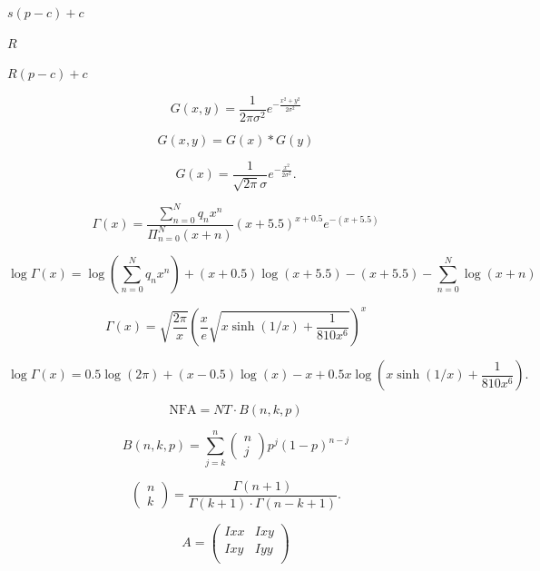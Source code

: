 \documentclass{article}
\begin{document}
$s (p - c) + c$
\pagebreak

$R$
\pagebreak

$R (p - c) + c$
\pagebreak

\[ G(x,y) = \frac{1}{2\pi\sigma^2} e^{-\frac{x^2+y^2}{2\sigma^2}} \]
\pagebreak

\[ G(x,y) = G(x) * G(y) \]
\pagebreak

\[ G(x) = \frac{1}{\sqrt{2\pi}\sigma} e^{-\frac{x^2}{2\sigma^2}}. \]
\pagebreak

\[ \Gamma(x) = \frac{ \sum_{n=0}^{N} q_n x^n }{ \Pi_{n=0}^{N} (x+n) } (x+5.5)^{x+0.5} e^{-(x+5.5)} \]
\pagebreak

\[ \log\Gamma(x) = \log\left( \sum_{n=0}^{N} q_n x^n \right) + (x+0.5) \log(x+5.5) - (x+5.5) - \sum_{n=0}^{N} \log(x+n) \]
\pagebreak

\[ \Gamma(x) = \sqrt{\frac{2\pi}{x}} \left( \frac{x}{e} \sqrt{ x\sinh(1/x) + \frac{1}{810x^6} } \right)^x \]
\pagebreak

\[ \log\Gamma(x) = 0.5\log(2\pi) + (x-0.5)\log(x) - x + 0.5x\log\left( x\sinh(1/x) + \frac{1}{810x^6} \right). \]
\pagebreak

\[ \mathrm{NFA} = NT \cdot B(n,k,p) \]
\pagebreak

\[ B(n,k,p) = \sum_{j=k}^n \left(\begin{array}{c}n\\j\end{array}\right) p^{j} (1-p)^{n-j} \]
\pagebreak

\[ \left(\begin{array}{c}n\\k\end{array}\right) = \frac{ \Gamma(n+1) }{ \Gamma(k+1) \cdot \Gamma(n-k+1) }. \]
\pagebreak

\[ A = \left(\begin{array}{cc} Ixx & Ixy \\ Ixy & Iyy \\ \end{array}\right) \]
\pagebreak
\end{document}
